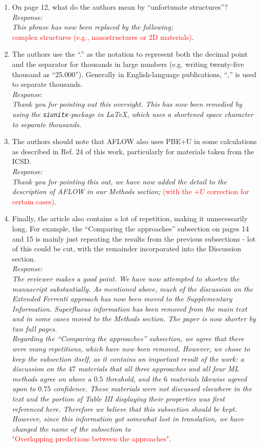 \documentclass[11pt, a4paper]{letter} %
\newcommand{\mrk}[1]{\textcolor{red}{#1}}
\begin{document}
\begin{enumerate}
    \item On page 12, what do the authors mean by “unfortunate structures”? \\ 
    \textit{Response:} \\ 
    \textit{This phrase has now been replaced by the following;} \\ 
    \mrk{complex structures (e.g., nanostructures or 2D materials)}. 
    \item The authors use the “.” as the notation to represent both the decimal point and the separator for thousands in large numbers (e.g. writing twenty-five thousand as “25.000”). Generally in English-language publications, “,” is used to separate thousands. \\ 
    \textit{Response}: \\
    \textit{Thank you for pointing out this oversight.
    This has now been remedied by using the \texttt{siunitx}-package in \LaTeX, which uses a shortened space character to separate thousands.
    }
    \item The authors should note that AFLOW also uses PBE+U in some calculations as described in Ref. 24 of this work, particularly for materials taken from the ICSD. \\
    \textit{Response:} \\ 
    \textit{Thank you for pointing this out, we have now added the detail to the description of AFLOW in our Methods section;} \mrk{(with the $+U$ correction for certain cases)}. 
    \item Finally, the article also contains a lot of repetition, making it unnecessarily long. For example, the “Comparing the approaches” subsection on pages 14 and 15 is mainly just repeating the results from the previous subsections - lot of this could be cut, with the remainder incorporated into the Discussion section. \\ 
    \textit{Response:} \\ 
    \textit{The reviewer makes a good point. We have now attempted to shorten the manuscript substantially. As mentioned above, much of the discussion on the Extended Ferrenti approach has now been moved to the Supplementary Information. Superfluous information has been removed from the main text and in some cases moved to the Methods section. The paper is now shorter by two full pages.} \\ 
    \textit{Regarding the “Comparing the approaches” subsection, we agree that there were many repetitions, which have now been removed. However, we chose to keep the subsection itself, as it  contains an important result of the work: a discussion on the $47$ materials that all three approaches and all four ML methods agree on above a $0.5$ threshold, and the $6$ materials likewise agreed upon to $0.75$ confidence. These materials were not discussed elsewhere in the text and the portion of Table III displaying their properties was first referenced here. Therefore we believe that this subsection should be kept. However, since this information got somewhat lost in translation, we have changed the name of the subsection to} \\ 
    \mrk{"Overlapping predictions between the approaches"}. 
\end{enumerate}
\end{document}
